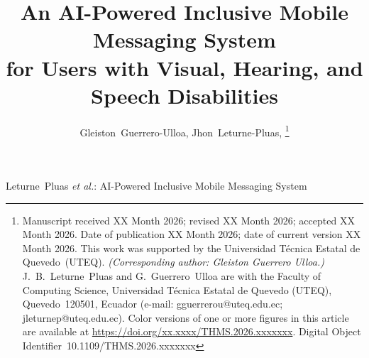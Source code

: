 \documentclass[journal]{IEEEtran}
\begin{document}
	
	\title{An AI-Powered Inclusive Mobile Messaging System\\
		for Users with Visual, Hearing, and Speech Disabilities}
		
		\author{Gleiston~Guerrero-Ulloa,%
			Jhon~Leturne-Pluas,%
			\thanks{Manuscript received XX Month 2026; revised XX Month 2026;
				accepted XX Month 2026. Date of publication XX Month 2026;
				date of current version XX Month 2026.
				This work was supported by the Universidad T\'ecnica Estatal de
				Quevedo~(UTEQ).
				\textit{(Corresponding author: Gleiston Guerrero Ulloa.)}
				J.~B.~Leturne~Pluas and G.~Guerrero~Ulloa are with the
				Faculty of Computing Science,
				Universidad T\'ecnica Estatal de Quevedo (UTEQ),
				Quevedo~120501, Ecuador
				(e-mail: gguerrerou@uteq.edu.ec; jleturnep@uteq.edu.ec).
				Color versions of one or more figures in this article are available
				at \protect\url{https://doi.org/xx.xxxx/THMS.2026.xxxxxxx}.
				Digital Object Identifier~10.1109/THMS.2026.xxxxxxx}}
		
		{Leturne~Pluas \MakeLowercase{\textit{et al.}}: AI-Powered Inclusive Mobile Messaging System}
				
	\maketitle
	
\end{document}
